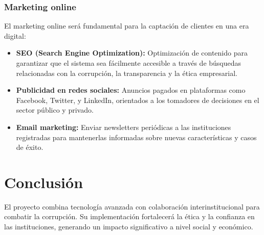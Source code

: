 \documentclass[a4paper,12pt]{article}
\begin{document}
\subsubsection{Marketing online}
El marketing online será fundamental para la captación de clientes en una era digital:

\begin{itemize}
    \item \textbf{SEO (Search Engine Optimization):} Optimización de contenido para garantizar que el sistema sea fácilmente accesible a través de búsquedas relacionadas con la corrupción, la transparencia y la ética empresarial.
    \item \textbf{Publicidad en redes sociales:} Anuncios pagados en plataformas como Facebook, Twitter, y LinkedIn, orientados a los tomadores de decisiones en el sector público y privado.
    \item \textbf{Email marketing:} Enviar newsletters periódicas a las instituciones registradas para mantenerlas informadas sobre nuevas características y casos de éxito.
\end{itemize}


\section{Conclusión}
El proyecto combina tecnología avanzada con colaboración interinstitucional para combatir la corrupción. Su implementación fortalecerá la ética y la confianza en las instituciones, generando un impacto significativo a nivel social y económico.
\end{document}
